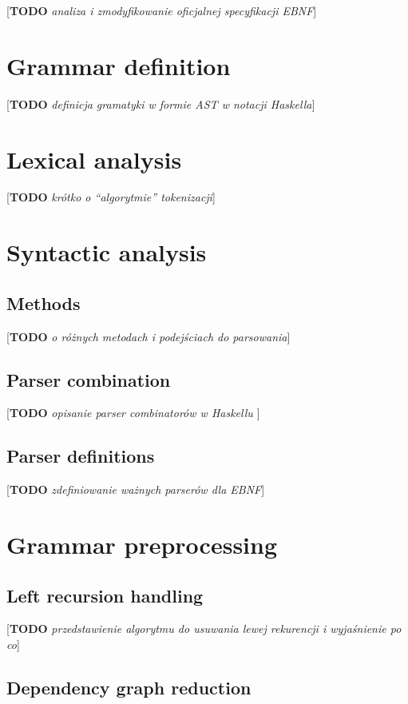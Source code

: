 \documentclass[english,engineering]{wizthesis}
\newcommand{\todo}[1]{{\color{red}[\textbf{TODO} \textit{#1}]}}
\begin{document}
\todo{analiza i zmodyfikowanie oficjalnej specyfikacji EBNF}

\section{Grammar definition}

\todo{definicja gramatyki w formie AST w notacji Haskella}

\section{Lexical analysis}

\todo{krótko o ``algorytmie'' tokenizacji}

\section{Syntactic analysis}

\subsection{Methods}

\todo{o różnych metodach i podejściach do parsowania}

\subsection{Parser combination}

\todo{opisanie parser combinatorów w Haskellu \cite{swierstra-2009}
\cite{leijen-2001} \cite{fokker-1995}}

\subsection{Parser definitions}

\todo{zdefiniowanie ważnych parserów dla EBNF}

\section{Grammar preprocessing}

\subsection{Left recursion handling}

\todo{przedstawienie algorytmu do usuwania lewej rekurencji i wyjaśnienie po co}

\subsection{Dependency graph reduction}
\end{document}

